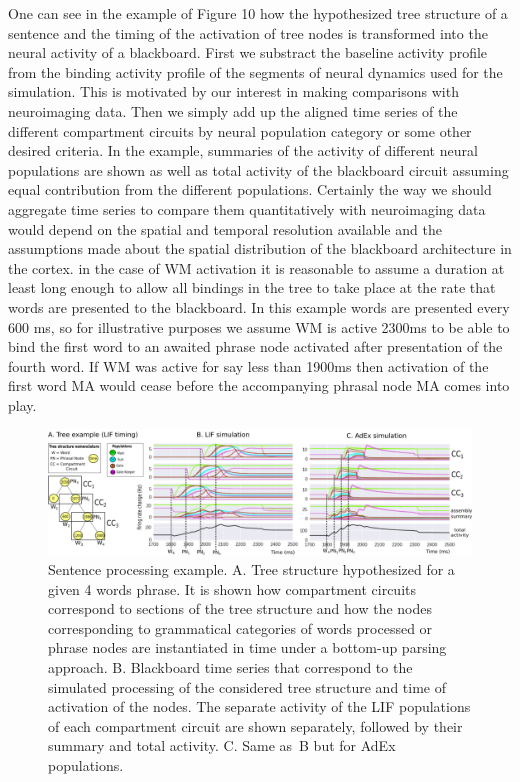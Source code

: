 \documentclass[10pt]{article}
\begin{document}
{One can see in the example of Figure 10 how the hypothesized tree structure of a sentence and the timing of the activation of tree nodes is transformed into the neural activity of a blackboard.
First we substract the baseline activity profile from the binding activity profile of the segments of neural dynamics used for the simulation.
This is motivated by our interest in making comparisons with neuroimaging data.
Then we simply add up the aligned time series of the different compartment circuits by neural population category or some other desired criteria.
In the example, summaries of the activity of different neural populations are shown as well as total activity of the blackboard circuit assuming equal contribution from the different populations.
Certainly the way we should aggregate time series to compare them quantitatively with neuroimaging data would depend on the spatial and temporal resolution available and the assumptions made about the spatial distribution of the blackboard architecture in the cortex.
in the case of WM activation it is reasonable to assume a duration at least long enough to allow all bindings in the tree to take place at the rate that words are presented to the blackboard.
In this example words are presented every 600 ms, so for illustrative purposes we assume WM is active 2300ms to be able to bind the first word to an awaited phrase node activated after presentation of the fourth word.
If WM was active for say less than 1900ms then activation of the first word MA would cease before the accompanying phrasal node MA comes into play.

\begin{figure}[h!]
  \begin{center}
    \includegraphics[width=1.00\columnwidth]{figures/compartments_tree_example/compartments_tree_example}
    \caption{Sentence processing example.
      A. Tree structure hypothesized for a given 4 words phrase.
      It is shown how compartment circuits correspond to sections of the tree structure and how the nodes corresponding to grammatical categories of words processed or phrase nodes are instantiated in time under a bottom-up parsing approach.
      B. Blackboard time series that correspond to the simulated processing of the considered tree structure and time of activation of the nodes.
      The separate activity of the LIF populations of each compartment circuit are shown separately, followed by their summary and total activity.
      C. Same as~B but for AdEx populations. {\label{679921}}%
    }
  \end{center}
\end{figure}


}
\end{document}
